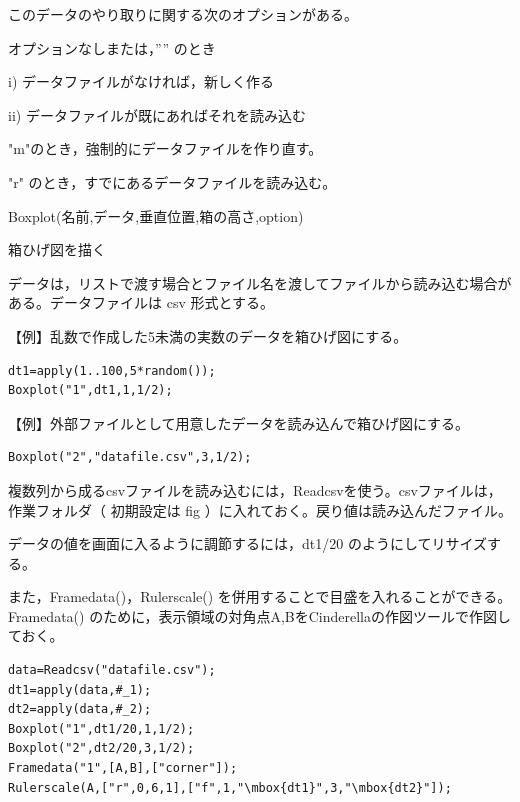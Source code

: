 \documentclass[papersize,a4paper,12pt,uplatex]{jsarticle}
\begin{document}
このデータのやり取りに関する次のオプションがある。

オプションなしまたは，”” のとき

i) データファイルがなければ，新しく作る

ii) データファイルが既にあればそれを読み込む

"m"のとき，強制的にデータファイルを作り直す。

"r" のとき，すでにあるデータファイルを読み込む。

\vspace{\baselineskip}

\begin{description}

\hypertarget{boxplot}{}
\item[関数]Boxplot(名前,データ,垂直位置,箱の高さ,option)
\item[機能]箱ひげ図を描く
\item[説明]データは，リストで渡す場合とファイル名を渡してファイルから読み込む場合がある。データファイルは csv 形式とする。

\vspace{\baselineskip}
【例】乱数で作成した5未満の実数のデータを箱ひげ図にする。

\begin{verbatim}
dt1=apply(1..100,5*random());
Boxplot("1",dt1,1,1/2);
\end{verbatim}
\vspace{\baselineskip}
\hspace{20mm} 

\vspace{\baselineskip}
【例】外部ファイルとして用意したデータを読み込んで箱ひげ図にする。
\begin{verbatim}
Boxplot("2","datafile.csv",3,1/2);
\end{verbatim}

\vspace{\baselineskip}
複数列から成るcsvファイルを読み込むには，Readcsvを使う。csvファイルは，作業フォルダ（ 初期設定は fig ）に入れておく。戻り値は読み込んだファイル。

データの値を画面に入るように調節するには，dt1/20 のようにしてリサイズする。
 
また，Framedata()，Rulerscale() を併用することで目盛を入れることができる。Framedata() のために，表示領域の対角点A,BをCinderellaの作図ツールで作図しておく。

\begin{verbatim}
data=Readcsv("datafile.csv");
dt1=apply(data,#_1);
dt2=apply(data,#_2);
Boxplot("1",dt1/20,1,1/2);
Boxplot("2",dt2/20,3,1/2);
Framedata("1",[A,B],["corner"]);
Rulerscale(A,["r",0,6,1],["f",1,"\mbox{dt1}",3,"\mbox{dt2}"]);
\end{verbatim}
 \begin{center}  \end{center}


\end{description}
\end{document}
